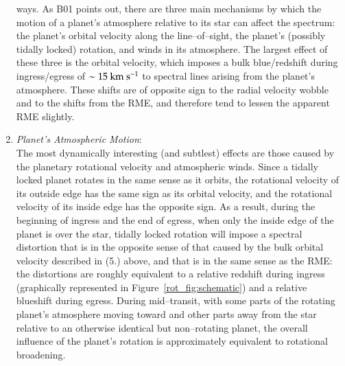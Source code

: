 \begin{enumerate}
 ways.  As B01 points out, there are three main mechanisms by which
 the motion of a planet's atmosphere relative to its star can affect
 the spectrum: the planet's orbital velocity along the
 line--of--sight, the planet's (possibly tidally locked) rotation, and
 winds in its atmosphere.  The largest effect of these three is the
 orbital velocity, which imposes a bulk blue/redshift during
 ingress/egress of $\sim 15 {\rm ~km~s^{-1}}$ to spectral lines
 arising from the planet's atmosphere.  These shifts are of opposite
 sign to the radial velocity wobble and to the shifts from the RME,
 and therefore tend to lessen the apparent RME slightly.
\item {\it Planet's Atmospheric Motion}:\\ The most dynamically
 interesting (and subtlest) effects are those caused by the planetary
 rotational velocity and atmospheric winds.  Since a tidally locked
 planet rotates in the same sense as it orbits, the rotational
 velocity of its outside edge has the same sign as its orbital
 velocity, and the rotational velocity of its inside edge has the
 opposite sign.  As a result, during the beginning of ingress and the
 end of egress, when only the inside edge of the planet is over the
 star, tidally locked rotation will impose a spectral distortion that
 is in the opposite sense of that caused by the bulk orbital velocity
 described in (5.) above, and that is in the same sense as the RME:
 the distortions are roughly equivalent to a relative redshift during
 ingress (graphically represented in Figure~\ref{rot_fig:schematic})
 and a relative blueshift during egress.  During mid--transit, with
 some parts of the rotating planet's atmosphere moving toward and
 other parts away from the star relative to an otherwise identical but
 non--rotating planet, the overall influence of the planet's rotation
 is approximately equivalent to rotational broadening.


\end{enumerate}
